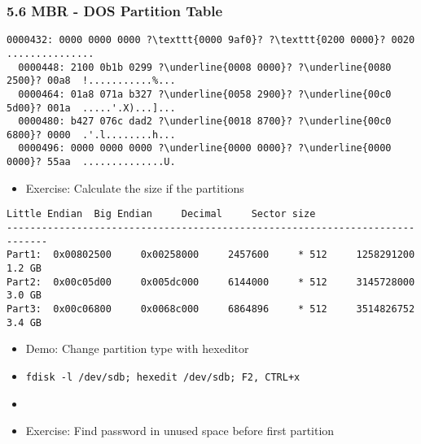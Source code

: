 \begin{frame}[fragile]
  \frametitle{5.6 MBR - DOS Partition Table}
  \begin{lstlisting}[basicstyle=\tiny,escapechar=\?]
  0000432: 0000 0000 0000 ?\texttt{0000 9af0}? ?\texttt{0200 0000}? 0020  ............... 
  0000448: 2100 0b1b 0299 ?\underline{0008 0000}? ?\underline{0080 2500}? 00a8  !...........%...
  0000464: 01a8 071a b327 ?\underline{0058 2900}? ?\underline{00c0 5d00}? 001a  .....'.X)...]...
  0000480: b427 076c dad2 ?\underline{0018 8700}? ?\underline{00c0 6800}? 0000  .'.l........h...
  0000496: 0000 0000 0000 ?\underline{0000 0000}? ?\underline{0000 0000}? 55aa  ..............U.

  \end{lstlisting}
    \begin{itemize}
	    \item[] Exercise: Calculate the size if the partitions
    \end{itemize}
  \begin{lstlisting}[basicstyle=\tiny]
        Little Endian  Big Endian     Decimal     Sector size
-----------------------------------------------------------------------------
Part1:  0x00802500     0x00258000     2457600     * 512     1258291200   1.2 GB
Part2:  0x00c05d00     0x005dc000     6144000     * 512     3145728000   3.0 GB
Part3:  0x00c06800     0x0068c000     6864896     * 512     3514826752   3.4 GB
  \end{lstlisting}
    \begin{itemize}
        \item Demo:     Change partition type with hexeditor
	\item[] \texttt{fdisk -l /dev/sdb; hexedit /dev/sdb; F2, CTRL+x}
	\item[]
        \item Exercise: Find password in unused space before first partition
    \end{itemize}
\end{frame}



